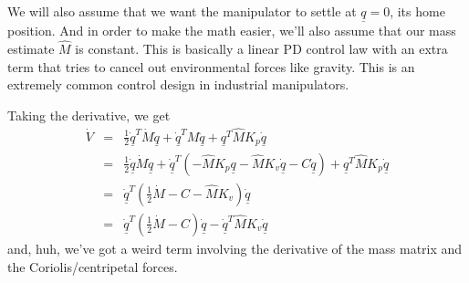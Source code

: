 \documentclass[]{article}
\begin{document}
We will also assume that we want the manipulator to settle at $\underline{q}=0$, its home position. And in order to make the math easier, we'll also assume that our mass estimate $\hat{M}$ is constant. This is basically a linear PD control law with an extra term that tries to cancel out environmental forces like gravity. This is an extremely common control design in industrial manipulators.


Taking the derivative, we get
\begin{eqnarray}
 \dot{V} & = & \frac{1}{2}\dot{\underline{q}}^{T}\dot{M}\dot{\underline{q}} + \underline{\dot{q}}^{T}M\underline{\ddot{q}} + \underline{q}^{T}\hat{M}K_{p}\dot{\underline{q}} \nonumber \\
 & = & \frac{1}{2}\underline{\dot{q}}\dot{M}\underline{\dot{q}} + \dot{\underline{q}}^{T}\left( -\hat{M}K_{p}\underline{q} - \hat{M}K_{v}\dot{\underline{q}}-C\dot{\underline{q}}\right) + \underline{q}^{T}\hat{M}K_{p}\dot{\underline{q}} \nonumber \\& = & \dot{\underline{q}}^{T}\left(\frac{1}{2}\dot{M} - C - \hat{M}K_{v}\right)\dot{\underline{q}} \nonumber \\
 & = & \dot{\underline{q}}^{T}\left( \frac{1}{2}\dot{M} - C\right)\dot{\underline{q}} - \dot{\underline{q}}^{T}\hat{M}K_{v}\dot{\underline{q}} \label{lyap1}
\end{eqnarray}
and, huh, we've got a weird term involving the derivative of the mass matrix and the Coriolis/centripetal forces. 
\end{document}
